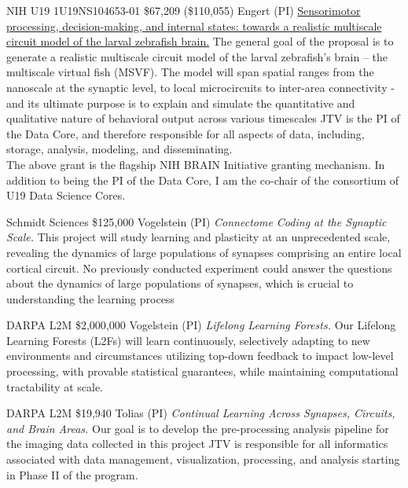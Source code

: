 \documentclass[10pt,colorlinks=true,urlcolor=blue]{moderncv}
\begin{document}
    {NIH U19 1U19NS104653-01}%
    {\$67,209 (\$110,055)}%
    {Engert (PI)}
    {\href{http://grantome.com/grant/NIH/U19-NS104653-02}%
    {Sensorimotor processing, decision-making, and internal states: towards a realistic multiscale circuit model of the larval zebrafish brain.} 
    The general goal of the proposal is to generate a realistic multiscale circuit model of the larval zebrafish’s brain – the multiscale virtual fish (MSVF). The model will span spatial ranges from the nanoscale at the synaptic level, to local microcircuits to inter-area connectivity - and its ultimate purpose is to explain and simulate the quantitative and qualitative nature of behavioral output across various timescales}%
    {JTV is the PI of the Data Core, and therefore responsible for all
        aspects of data, including, storage, analysis, modeling, and
        disseminating.\\
    The above grant is the flagship NIH BRAIN Initiative granting mechanism.  In addition to being the PI of the Data Core, I am the co-chair of the consortium of U19 Data Science Cores.}


    {Schmidt Sciences}%
    {\$125,000}%
    {Vogelstein (PI)}
    {\emph{Connectome Coding at the Synaptic Scale.} 
    This project will study learning and plasticity at an unprecedented scale, revealing the dynamics of large populations of synapses comprising an entire local cortical circuit. No previously conducted experiment could answer the questions about the dynamics of large populations of synapses, which is crucial to understanding the learning process}%
    {}
    {}

    {DARPA L2M}%
    {\$2,000,000}%
    {Vogelstein (PI)}
    {\emph{Lifelong Learning Forests.}
    Our Lifelong Learning Forests (L2Fs) will learn continuously, selectively adapting to new environments and circumstances utilizing top-down feedback to impact low-level processing, with provable statistical guarantees, while maintaining computational tractability at scale.  }%
    {}
    {}

    {DARPA L2M}%
    {\$19,940}%
    {Tolias (PI)}    
    {\emph{Continual Learning Across Synapses, Circuits, and Brain Areas.}
    Our  goal is to develop the pre-processing analysis pipeline for the imaging data collected in this project}%
    {JTV is responsible for all informatics associated with data management, visualization, processing, and analysis starting in Phase II of the program.}
    {}
\end{document}
